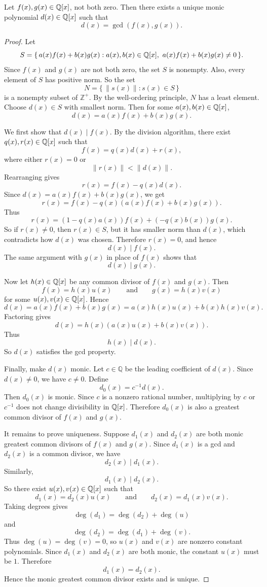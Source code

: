 \begin{theorem}
Let $f(x),g(x)\in\mathbb{Q}[x]$, not both zero. Then there exists a unique monic
polynomial $d(x)\in\mathbb{Q}[x]$ such that
\[
d(x)=\gcd(f(x),g(x)).
\]
\end{theorem}

\begin{proof}
Let
\[
S=\{\,a(x)f(x)+b(x)g(x):a(x),b(x)\in\Qx,\ a(x)f(x)+b(x)g(x)\neq0\,\}.
\]
Since $f(x)$ and $g(x)$ are not both zero, the set $S$ is nonempty. Also, every
element of $S$ has positive norm. So the set
\[
N=\{\,\|s(x)\|:s(x)\in S\,\}
\]
is a nonempty subset of $\mathbb{Z}^+$. By the well-ordering principle, $N$ has
a least element. Choose $d(x)\in S$ with smallest norm. Then for some
$a(x),b(x)\in\mathbb{Q}[x]$,
\[
d(x)=a(x)f(x)+b(x)g(x).
\]

We first show that $d(x)\mid f(x)$. By the division algorithm, there exist
$q(x),r(x)\in\mathbb{Q}[x]$ such that
\[
f(x)=q(x)d(x)+r(x),
\]
where either $r(x)=0$ or
\[
\|r(x)\|<\|d(x)\|.
\]
Rearranging gives
\[
r(x)=f(x)-q(x)d(x).
\]
Since $d(x)=a(x)f(x)+b(x)g(x)$, we get
\[
r(x)=f(x)-q(x)(a(x)f(x)+b(x)g(x)).
\]
Thus
\[
r(x)=(1-q(x)a(x))f(x)+(-q(x)b(x))g(x).
\]
So if $r(x)\neq0$, then $r(x)\in S$, but it has smaller norm than $d(x)$,
which contradicts how $d(x)$ was chosen. Therefore $r(x)=0$, and hence
\[
d(x)\mid f(x).
\]
The same argument with $g(x)$ in place of $f(x)$ shows that
\[
d(x)\mid g(x).
\]

Now let $h(x)\in\mathbb{Q}[x]$ be any common divisor of $f(x)$ and $g(x)$. Then
\[
f(x)=h(x)u(x)
\qquad\text{and}\qquad
g(x)=h(x)v(x)
\]
for some $u(x),v(x)\in\mathbb{Q}[x]$. Hence
\[
d(x)=a(x)f(x)+b(x)g(x)
=a(x)h(x)u(x)+b(x)h(x)v(x).
\]
Factoring gives
\[
d(x)=h(x)(a(x)u(x)+b(x)v(x)).
\]
Thus
\[
h(x)\mid d(x).
\]
So $d(x)$ satisfies the gcd property.

Finally, make $d(x)$ monic. Let $c\in\mathbb{Q}$ be the leading coefficient of
$d(x)$. Since $d(x)\neq0$, we have $c\neq0$. Define
\[
d_0(x)=c^{-1}d(x).
\]
Then $d_0(x)$ is monic. Since $c$ is a nonzero rational number, multiplying by
$c$ or $c^{-1}$ does not change divisibility in $\mathbb{Q}[x]$. Therefore $d_0(x)$ is
also a greatest common divisor of $f(x)$ and $g(x)$.

It remains to prove uniqueness. Suppose $d_1(x)$ and $d_2(x)$ are both monic
greatest common divisors of $f(x)$ and $g(x)$. Since $d_1(x)$ is a gcd and
$d_2(x)$ is a common divisor, we have
\[
d_2(x)\mid d_1(x).
\]
Similarly,
\[
d_1(x)\mid d_2(x).
\]
So there exist $u(x),v(x)\in\mathbb{Q}[x]$ such that
\[
d_1(x)=d_2(x)u(x)
\qquad\text{and}\qquad
d_2(x)=d_1(x)v(x).
\]
Taking degrees gives
\[
\deg(d_1)=\deg(d_2)+\deg(u)
\]
and
\[
\deg(d_2)=\deg(d_1)+\deg(v).
\]
Thus $\deg(u)=\deg(v)=0$, so $u(x)$ and $v(x)$ are nonzero constant
polynomials. Since $d_1(x)$ and $d_2(x)$ are both monic, the constant $u(x)$
must be $1$. Therefore
\[
d_1(x)=d_2(x).
\]
Hence the monic greatest common divisor exists and is unique.
\end{proof}
